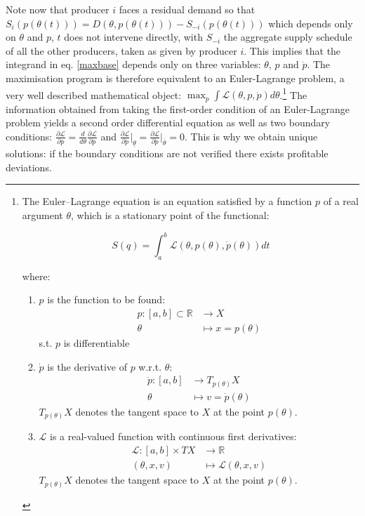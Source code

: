 Note now that producer $i$ faces a residual demand so that $S_i(p(\theta(t)))=D(\theta,p(\theta(t)))-S_{-i}(p(\theta(t)))$ which depends only on $\theta$ and $p$, $t$ does not intervene directly, with $S_{-i}$ the aggregate supply schedule of all the other producers, taken as given by producer $i$. This implies that the integrand in eq. \ref{maxbase} depends only on three variables: $\theta$, $p$ and $\dot{p}$.  The maximisation program is therefore equivalent to an Euler-Lagrange problem, a very well described mathematical object: $\max_p\int\mathcal{L}(\theta,p,\dot{p})d\theta$.\footnote{The Euler–Lagrange equation is an equation satisfied by a function  $p$ of a real argument $\theta$, which is a stationary point of the functional:

$$ S(q) = \int_a^b \mathcal{L}(\theta,p(\theta),\dot{p}(\theta))dt$$

where:
\begin{enumerate}
\item $p$ is the function to be found:
\begin{align*}
p \colon [a,b] \subset \mathbb{R} &\to X\\
\theta & \mapsto x=p(\theta)
\end{align*}
s.t. $p$ is differentiable
\item $\dot{p}$ is the derivative of $p$ w.r.t. $\theta$:
\begin{align*}
\dot{p} \colon [a,b] &\to T_{p(\theta)}X\\
\theta & \mapsto v=\dot{p}(\theta)
\end{align*}
$T_{p(\theta)}X$ denotes the tangent space to $X$ at the point $p(\theta)$.
\item $\mathcal{L}$ is a real-valued function with continuous first derivatives:
\begin{align*}
\mathcal{L} \colon [a,b] \times TX &\to\mathbb{R}\\
(\theta,x,v) & \mapsto \mathcal{L}(\theta,x,v)
\end{align*}
$T_{p(\theta)}X$ denotes the tangent space to $X$ at the point $p(\theta)$.
\end{enumerate}
}
The information obtained from taking the first-order condition of an Euler-Lagrange problem yields a second order differential equation as well as two boundary conditions: $\frac{\partial\mathcal{L}}{\partial p}=\frac{d}{d\theta}\frac{\partial\mathcal{L}}{\partial \dot{p}}$ and $\frac{\partial\mathcal{L}}{\partial\dot{p}}\big|_{\underline{\theta}}=\frac{\partial\mathcal{L}}{\partial\dot{p}}\big|_{\overline{\theta}}=0$. This is why we obtain unique solutions: if the boundary conditions are not verified there exists profitable deviations. \\

